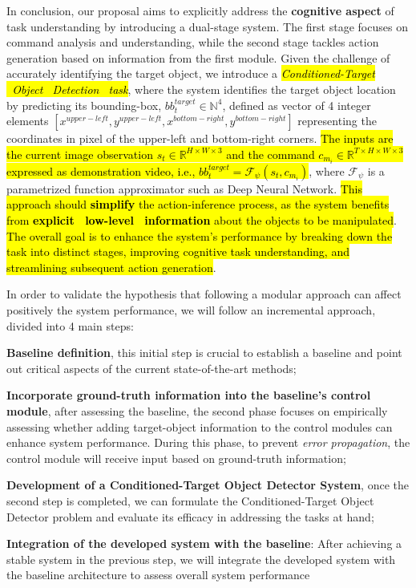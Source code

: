In conclusion, our proposal aims to explicitly address the \textbf{cognitive aspect} of task understanding by introducing a dual-stage system. The first stage focuses on command analysis and understanding, while the second stage tackles action generation based on information from the first module. Given the challenge of accurately identifying the target object, we introduce a \hl{\textit{Conditioned-Target \ Object \ Detection \ task}}, where the system identifies the target object location by predicting its bounding-box, $bb_{t}^{target} \in \mathbb{N}^{4}$, defined as vector of 4 integer elements $[x^{upper-left},y^{upper-left}, x^{bottom-right}, y^{bottom-right}]$ representing the coordinates in pixel of the upper-left and bottom-right corners. \hl{The inputs are the current image observation $s_{t} \in \mathbb{R}^{H \times W \times 3}$ and the command $c_{m_{i}} \in \mathbb{R}^{T \times H \times W \times 3}$ expressed as demonstration video, i.e., $bb_{t}^{target} = \mathcal{F}_{\psi}(s_{t}, c_{m_{i}})$}, where $\mathcal{F}_{\psi}$ is a parametrized function approximator such as Deep Neural Network. \hl{This approach should \textbf{simplify} the action-inference process, as the system benefits from \textbf{explicit \ low-level  \ information} about the objects to be manipulated}. \hl{The overall goal is to enhance the system's performance by breaking down the task into distinct stages, improving cognitive task understanding, and streamlining subsequent action generation}.

In order to validate the hypothesis that following a modular approach can affect positively the system performance, we will follow an incremental approach, divided into 4 main steps:
\begin{enumerate*}[label=(\arabic*)]
    \item \textbf{Baseline definition}, this initial step is crucial to establish a baseline and point out critical aspects of the current state-of-the-art methods;
    \item \textbf{Incorporate ground-truth information into the baseline's control module}, after assessing the baseline, the second phase focuses on empirically assessing whether adding target-object information to the control modules can enhance system performance. During this phase, to prevent \textit{error propagation}, the control module will receive input based on ground-truth information;
    \item \textbf{Development of a Conditioned-Target Object Detector System}, once the second step is completed, we can formulate the Conditioned-Target Object Detector problem and evaluate its efficacy in addressing the tasks at hand;
    \item \textbf{Integration of the developed system with the baseline}: After achieving a stable system in the previous step, we will integrate the developed system with the baseline architecture to assess overall system performance
\end{enumerate*}

